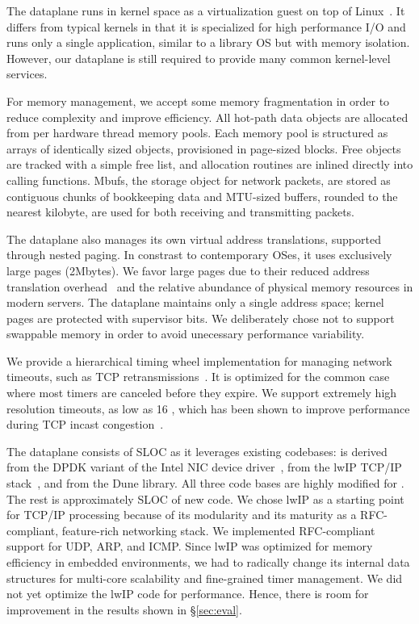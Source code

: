The \ix dataplane runs in kernel space as a virtualization guest on
top of Linux~\cite{dune}. It differs from typical kernels in that it
is specialized for high performance I/O and runs only a single
application, similar to a library OS but with memory
isolation. However, our dataplane is still required to provide many
common kernel-level services.

For memory management, we accept some memory fragmentation in order to
reduce complexity and improve efficiency. All hot-path data objects
are allocated from per hardware thread memory pools. Each memory pool
is structured as arrays of identically sized objects, provisioned in
page-sized blocks. Free objects are tracked with a simple free list,
and allocation routines are inlined directly into calling
functions. Mbufs, the storage object for network packets, are stored
as contiguous chunks of bookkeeping data and MTU-sized buffers,
rounded to the nearest kilobyte, are used for both receiving and
transmitting packets.

The dataplane also manages its own virtual address translations,
supported through nested paging. In constrast to contemporary OSes, it
uses exclusively large pages (2Mbytes). We favor large pages due to
their reduced address translation
overhead~\cite{DBLP:conf/isca/BasuGCHS13, dune} and the relative
abundance of physical memory resources in modern servers. The
dataplane maintains only a single address space; kernel pages are
protected with supervisor bits. We deliberately chose not to support
swappable memory in order to avoid unecessary performance variability.

We provide a hierarchical timing wheel implementation for managing
network timeouts, such as TCP
retransmissions~\cite{DBLP:conf/sosp/VargheseL87}. It is optimized for
the common case where most timers are canceled before they expire. We
support extremely high resolution timeouts, as low as 16 \microsecond,
which has been shown to improve performance during TCP incast
congestion~\cite{DBLP:conf/sigcomm/VasudevanPSKAGGM09}.

The \ix dataplane  consists of 
SLOC%
as it leverages existing codebases:  is derived from
the DPDK variant of the Intel NIC device driver~\cite{intel:dpdk},
 from the lwIP TCP/IP stack~\cite{dunkels2001design},
and  from the Dune library.  All three code bases are
highly modified for \ix. The rest is approximately  SLOC
of new code. We chose lwIP as a starting point for TCP/IP processing
because of its modularity and its maturity as a RFC-compliant,
feature-rich networking stack. We implemented RFC-compliant support
for UDP, ARP, and ICMP.  Since lwIP was optimized for memory
efficiency in embedded environments, we had to radically change its
internal data structures for multi-core scalability and fine-grained
timer management. We did not yet optimize the lwIP code for
performance. Hence, there is room for improvement in the results shown
in \S\ref{sec:eval}.

